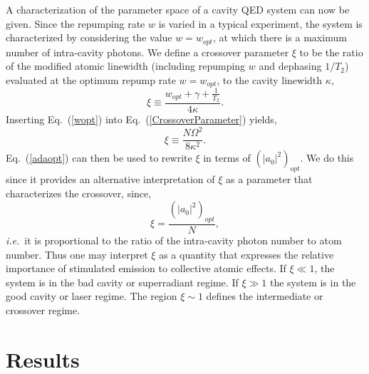 \documentclass[aps,
twocolumn,
superscriptaddress,groupedaddress]{revtex4}
\begin{document}
A characterization of the parameter space of a cavity QED system can
now be given. Since the repumping rate $w$ is varied in a typical
experiment, the system is characterized by considering the value
$w=w_{opt}$, at which there is a maximum number of intra-cavity
photons. We define a crossover parameter $\xi$ to be the ratio of the
modified atomic linewidth (including repumping $w$ and dephasing
$1/T_2$) evaluated at the optimum repump rate $w=w_{opt}$, to the
cavity linewidth $\kappa$,
\begin{equation}
\xi\equiv\frac{ w_{opt}+\gamma+\frac{1}{T_2}}{4\kappa}.
\label{CrossoverParameter}
\end{equation}
Inserting Eq.~(\ref{wopt}) into  Eq.~(\ref{CrossoverParameter}) yields,
\begin{equation}
\xi\equiv \frac{N \Omega^2}{8\kappa^2}.
\label{CrossoverParameter2}
\end{equation}
Eq.~(\ref{adaopt}) can then be used to rewrite $\xi$ in terms of
$(|a_0|^2)_{opt}$. We do this since it provides an alternative
interpretation of $\xi$ as a parameter that characterizes the
crossover, since,
\begin{equation}
\xi = \frac{(|a_0|^2)_{opt}}{N},
\end{equation}
{\em i.e.}\ it is proportional to the ratio of the intra-cavity photon
number to atom number. Thus one may interpret $\xi$ as a quantity that
expresses the relative importance of stimulated emission to collective
atomic effects. If $\xi\ll1$, the system is in the bad cavity or superradiant
regime. If $\xi\gg1$ the system is in the good cavity or laser
regime. The region $\xi\sim1$ defines the intermediate or crossover regime.


\section{Results}
\label{sec:Results}
\end{document}
